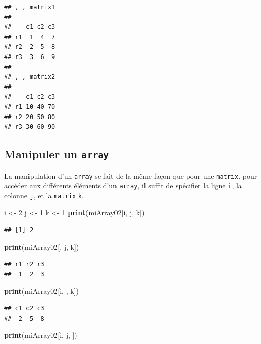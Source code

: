 \documentclass[]{book}
\newenvironment{Shaded}{\begin{snugshade}}{\end{snugshade}}
\newcommand{\DecValTok}[1]{\textcolor[rgb]{0.00,0.00,0.81}{#1}}
\newcommand{\KeywordTok}[1]{\textcolor[rgb]{0.13,0.29,0.53}{\textbf{#1}}}
\newcommand{\NormalTok}[1]{#1}
\newcommand{\StringTok}[1]{\textcolor[rgb]{0.31,0.60,0.02}{#1}}
\begin{document}
\begin{verbatim}
## , , matrix1
## 
##    c1 c2 c3
## r1  1  4  7
## r2  2  5  8
## r3  3  6  9
## 
## , , matrix2
## 
##    c1 c2 c3
## r1 10 40 70
## r2 20 50 80
## r3 30 60 90
\end{verbatim}

\hypertarget{manipuler-un-array}{%
\subsection{\texorpdfstring{Manipuler un \texttt{array}}{Manipuler un array}}\label{manipuler-un-array}}

La manipulation d'un \texttt{array} se fait de la même façon que pour une \texttt{matrix}. pour accèder aux différents éléments d'un \texttt{array}, il suffit de spécifier la ligne \texttt{i}, la colonne \texttt{j}, et la \texttt{matrix} \texttt{k}.

\begin{Shaded}
\begin{Highlighting}[]
\NormalTok{i <-}\StringTok{ }\DecValTok{2}
\NormalTok{j <-}\StringTok{ }\DecValTok{1}
\NormalTok{k <-}\StringTok{ }\DecValTok{1}
\KeywordTok{print}\NormalTok{(miArray02[i, j, k])}
\end{Highlighting}
\end{Shaded}

\begin{verbatim}
## [1] 2
\end{verbatim}

\begin{Shaded}
\begin{Highlighting}[]
\KeywordTok{print}\NormalTok{(miArray02[, j, k])}
\end{Highlighting}
\end{Shaded}

\begin{verbatim}
## r1 r2 r3 
##  1  2  3
\end{verbatim}

\begin{Shaded}
\begin{Highlighting}[]
\KeywordTok{print}\NormalTok{(miArray02[i, , k])}
\end{Highlighting}
\end{Shaded}

\begin{verbatim}
## c1 c2 c3 
##  2  5  8
\end{verbatim}

\begin{Shaded}
\begin{Highlighting}[]
\KeywordTok{print}\NormalTok{(miArray02[i, j, ])}
\end{Highlighting}
\end{Shaded}
\end{document}
